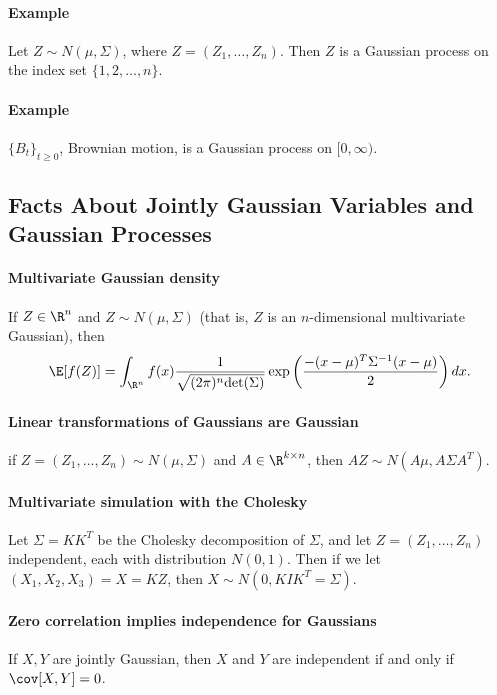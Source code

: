 \paragraph{Example} Let $Z\sim N(\mu, \Sigma)$, where $Z=(Z_1,\dots,Z_n)$.  Then $Z$ is a Gaussian process on the index set $\{1,2,\dots,n\}$.

\paragraph{Example} $\{B_t\}_{t\geq 0}$, Brownian motion, is a Gaussian process on $[0,\infty)$.


\subsection{Facts About Jointly Gaussian Variables and Gaussian Processes}

\paragraph{Multivariate Gaussian density}
    If $Z\in\R^n$ and $Z\sim N(\mu,\Sigma)$ (that is, $Z$ is an $n$-dimensional multivariate Gaussian), then 
        $$\begin{aligned}
            \E[f(Z)]=\int_{\R^n}f(x)\dfrac{1}{\sqrt{(2\pi)^n\mathrm{det}(\Sigma)}}\exp\left(\dfrac{-(x-\mu)^T\Sigma^{-1}(x-\mu)}{2}\right)dx.
        \end{aligned}$$

\paragraph{Linear transformations of Gaussians are Gaussian}
        if $Z=(Z_1,\dots,Z_n)\sim N(\mu,\Sigma)$ and $A\in\R^{k\times n}$, then $AZ\sim N(A\mu, A\Sigma A^T)$.

\paragraph{Multivariate simulation with the Cholesky} 
Let $\Sigma= KK^T$ be the Cholesky decomposition of $\Sigma$, 
    and let $Z=(Z_1,\dots,Z_n)$ independent, each with distribution $N(0,1)$.  
    Then if we let $(X_1,X_2,X_3)=X=KZ$, then $X\sim N(0,KIK^T=\Sigma)$.

\paragraph{Zero correlation implies independence for Gaussians} 
    If $X,Y$ are jointly Gaussian, then $X$ and $Y$ are independent if and only if $\cov[X,Y]=0$.

